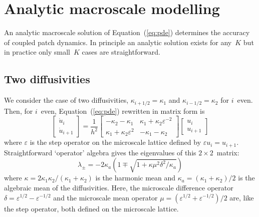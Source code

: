 \documentclass[12pt,a4paper]{article}
\begin{document}
\section{Analytic macroscale modelling}
\label{sec:analytic}

An analytic macroscale solution of Equation~(\ref{eq:pde}) determines the accuracy of coupled patch dynamics. In principle an analytic solution exists for any~$K$ but in practice only small~$K$ cases are straightforward.

\subsection{Two diffusivities}

We consider the case of two diffusivities, $\kappa_{i+1/2}=\kappa_1$ and $\kappa_{i-1/2}=\kappa_2$ for $i$~even. Then, for $i$~even, Equation~(\ref{eq:pde}) rewritten in matrix form is 
\begin{equation}
\begin{bmatrix}
\dot{u}_i\\
\dot{u}_{i+1}
\end{bmatrix}=\frac{1}{h^2}\begin{bmatrix}
-\kappa_2-\kappa_1 & \kappa_1+\kappa_2\varepsilon ^{-2}\\
\kappa_1+\kappa_2\varepsilon ^2 & -\kappa_1-\kappa_2
\end{bmatrix}\begin{bmatrix}
u_i\\
u_{i+1}
\end{bmatrix}\label{eq:matrix}
\end{equation}
where  $\varepsilon $ is the step operator on the microscale lattice defined by $\varepsilon u_i=u_{i+1}$. Straightforward `operator' algebra gives the eigenvalues of this $2\times 2$~matrix:
\begin{equation}
\lambda_{\pm}=-2\kappa_a\left(1\mp \sqrt{1+\kappa\mu^2\delta^2/\kappa_a}\right)
\end{equation}
where $\kappa=2\kappa_1\kappa_2/(\kappa_1+\kappa_2)$ is the harmonic mean and $\kappa_a=(\kappa_1+\kappa_2)/2$ is the algebraic mean of the diffusivities. Here,  the microscale difference operator $\delta=\varepsilon ^{1/2}-\varepsilon ^{-1/2}$ and the microscale mean operator $\mu=(\varepsilon ^{1/2}+\varepsilon ^{-1/2})/2$ are, like the step operator, both defined on the microscale lattice.
\end{document}
